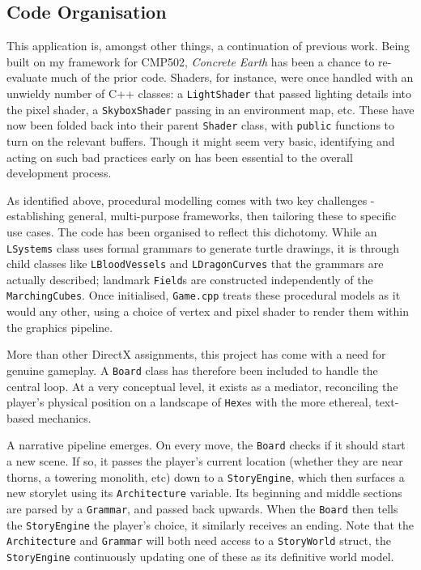 \documentclass[a4paper, 11pt]{article}
\begin{document}
\begin{flushleft}
\section{Code Organisation}

This application is, amongst other things, a continuation of previous work. Being built on my framework for CMP502, \textit{Concrete Earth} has been a chance to re-evaluate much of the prior code. Shaders, for instance, were once handled with an unwieldy number of C++ classes: a \texttt{LightShader} that passed lighting details into the pixel shader, a \texttt{SkyboxShader} passing in an environment map, etc. These have now been folded back into their parent \texttt{Shader} class, with \texttt{public} functions to turn on the relevant buffers. Though it might seem very basic, identifying and acting on such bad practices early on has been essential to the overall development process.

\vspace{5pt}\noindent
As identified above, procedural modelling comes with two key challenges - establishing general, multi-purpose frameworks, then tailoring these to specific use cases. The code has been organised to reflect this dichotomy. While an \texttt{LSystems} class uses formal grammars to generate turtle drawings, it is through child classes like \texttt{LBloodVessels} and \texttt{LDragonCurves} that the grammars are actually described; landmark \texttt{Field}s are constructed independently of the \texttt{MarchingCubes}. Once initialised, \texttt{Game.cpp} treats these procedural models as it would any other, using a choice of vertex and pixel shader to render them within the graphics pipeline.

\vspace{5pt}\noindent
More than other DirectX assignments, this project has come with a need for genuine gameplay. A \texttt{Board} class has therefore been included to handle the central loop. At a very conceptual level, it exists as a mediator, reconciling the player's physical position on a landscape of \texttt{Hex}es with the more ethereal, text-based mechanics. 

\vspace{5pt}\noindent
A narrative pipeline emerges. On every move, the \texttt{Board} checks if it should start a new scene. If so, it passes the player's current location (whether they are near thorns, a towering monolith, etc) down to a \texttt{StoryEngine}, which then surfaces a new storylet using its \texttt{Architecture} variable. Its beginning and middle sections are parsed by a \texttt{Grammar}, and passed back upwards. When the \texttt{Board} then tells the \texttt{StoryEngine} the player's choice, it similarly receives an ending. Note that the \texttt{Architecture} and \texttt{Grammar} will both need access to a \texttt{StoryWorld} struct, the \texttt{StoryEngine} continuously updating one of these as its definitive world model.


\end{flushleft}
\end{document}
